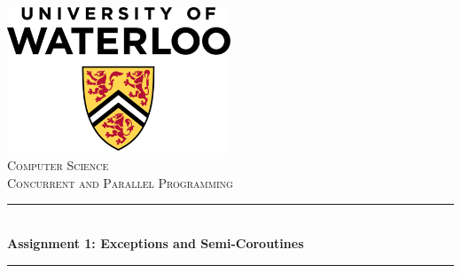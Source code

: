 \documentclass[12pt]{article}
\begin{document}
\begin{titlepage}

\newcommand{\HRule}{\rule{\linewidth}{0.5mm}} %

\center %

\includegraphics[width=0.5\textwidth]{media/uwlogo}\\[1cm] %



\textsc{\Large Computer Science}\\[0.5cm] %
\textsc{\large Concurrent and Parallel Programming}\\[2.5cm] %


\HRule \\[0.4cm]
{ \huge \bfseries Assignment 1: Exceptions and Semi-Coroutines}\\[0.4cm] %
\HRule \\[4.5cm]




\end{titlepage}
\end{document}
